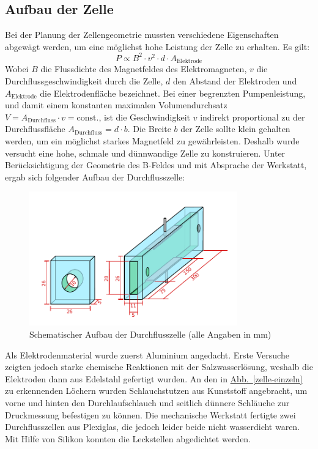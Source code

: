 \documentclass[11pt]{scrartcl}
\newcommand{\abb}[1]{\hyperref[#1]{Abb.~\ref{#1}}}
\begin{document}
\subsection{Aufbau der Zelle}			%
Bei der Planung der Zellengeometrie mussten verschiedene Eigenschaften abgewägt werden, um eine möglichst hohe Leistung der Zelle zu erhalten.
Es gilt:
\begin{equation}
P \propto B^2 \cdot v^2 \cdot d \cdot A_{\text{Elektrode}}
\end{equation}
Wobei $B$ die Flussdichte des Magnetfeldes des Elektromagneten, $v$ die Durchflussgeschwindigkeit durch die Zelle, $d$ den Abstand der Elektroden und $A_{\text{Elektrode}}$ die Elektrodenfläche bezeichnet. 
Bei einer begrenzten Pumpenleistung, und damit einem konstanten maximalen Volumendurchsatz $V=A_{\text{Durchfluss}} \cdot v=\text{const.}$, ist die Geschwindigkeit $v$ indirekt proportional zu der Durchflussfläche $A_{\text{Durchfluss}} = d \cdot b$.
Die Breite $b$ der Zelle sollte klein gehalten werden, um ein möglichst starkes Magnetfeld zu gewährleisten. Deshalb wurde versucht eine hohe, schmale und dünnwandige Zelle zu konstruieren.
Unter Berücksichtigung der Geometrie des B-Feldes und mit Absprache der Werkstatt, ergab sich folgender Aufbau der Durchflusszelle:

\begin{figure}[ht]
\begin{center}
\includegraphics[width=0.8\textwidth]{images/zelle-schema.pdf}
\end{center}
\vspace{-1.5\baselineskip}
\caption{Schematischer Aufbau der Durchflusszelle (alle Angaben in mm)}
\label{zelle-schema}
\end{figure}

Als Elektrodenmaterial wurde zuerst Aluminium angedacht. Erste Versuche zeigten jedoch starke chemische Reaktionen mit der Salzwasserlösung, weshalb die Elektroden dann aus Edelstahl gefertigt wurden. 
An den in \abb{zelle-einzeln} zu erkennenden Löchern wurden Schlauchstutzen aus Kunststoff angebracht, um vorne und hinten den Durchlaufschlauch und seitlich dünnere Schläuche zur Druckmessung befestigen zu können.
Die mechanische Werkstatt fertigte zwei Durchflusszellen aus Plexiglas, die jedoch leider beide nicht wasserdicht waren. Mit Hilfe von Silikon konnten die Leckstellen abgedichtet werden.
\end{document}
